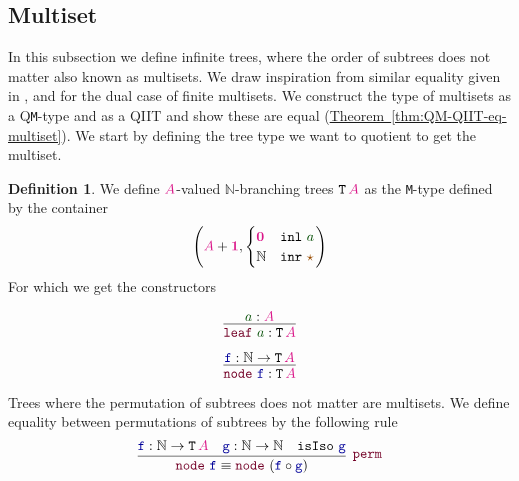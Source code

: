 \documentclass[twoside,11pt,openright]{report}
\theoremstyle{plain} %
\theoremstyle{definition}
\newtheorem{defn}[thm]{Definition}%
\theoremstyle{remark}
\newcommand*{\thmref}[1]{\hyperref[thm:#1]{Theorem~\ref*{thm:#1}}} %
\newcommand*{\term}[1]{\textcolor{green!30!black}{#1}} %
\newcommand*{\type}[1]{\textcolor{magenta!90!black}{#1}}
\newcommand*{\unit}{\type{\textbf{1}}}
\newcommand*{\empt}{\type{\textbf{0}}}
\newcommand*{\constant}[1]{\textcolor{orange!60!black}{\ensuremath{\mathtt{#1}}}}
\newcommand*{\function}[1]{\textcolor{blue!60!black}{\ensuremath{\mathtt{#1}}}}
\newcommand*{\constructor}[1]{\textcolor{purple!60!black}{\ensuremath{\mathtt{#1}}}}
\newcommand*{\typeformer}[1]{\ensuremath{\mathtt{#1}}}
\newcommand*{\unitelem}{\constant{\star}} %
\begin{document}
\subsection{Multiset}
\label{sec:multiset}
In this subsection we define infinite trees, where the order of subtrees does not matter also known as multisets. We draw inspiration from similar equality given in \cite{DBLP:QIIT}, \cite{DBLP:tt-in-tt} and \cite{DBLP:Constructing-QIITs} for the dual case of finite multisets. We construct the type of multisets as a Q\texttt{M}-type and as a QIIT and show these are equal (\thmref{QM-QIIT-eq-multiset}). We start by defining the tree type we want to quotient to get the multiset.
\begin{defn}
  We define \(\type{A}\)-valued \(\mathbb{N}\)-branching trees \(\typeformer{T}\,\type{A}\) as the \texttt{M}-type defined by the container
  \begin{equation}
    \left(\type{A}+\unit, \begin{cases} \empt & \mathtt{inl}~\term{a} \\ \mathbb{N} & \mathtt{inr}~\unitelem \end{cases}\right)
  \end{equation}
  For which we get the constructors\\[-10mm]
  \begin{center}
    \strut
    \hfill
    \begin{minipage}[b]{0.25\linewidth}
      \begin{equation}
        \vcenter{\infer{\constructor{leaf}~\term{a} : \typeformer{T}\,\type{A}}{\term{a} : \type{A}}}
      \end{equation}
    \end{minipage}
    \hfill
    \begin{minipage}[b]{0.25\linewidth}
      \begin{equation}
        \vcenter{\infer{\constructor{node}~\function{f} : \typeformer{T}\,\type{A}}{\function{f} : \mathbb{N} \rightarrow \typeformer{T}\,\type{A}}}
      \end{equation}
    \end{minipage}
    \hfill
    \strut
  \end{center}
\end{defn}
\noindent Trees where the permutation of subtrees does not matter are multisets. We define equality between permutations of subtrees by the following rule
\begin{equation}
  \vcenter{\infer[\constructor{perm}]{\constructor{node}~\function{f} \equiv \constructor{node}~(\function{f} \circ \function{g})}{\function{f} : \mathbb{N} \rightarrow \typeformer{T}\,\type{A} & \function{g} : \mathbb{N} \rightarrow \mathbb{N} & \mathtt{isIso}~\function{g}}}
\end{equation}
\end{document}
